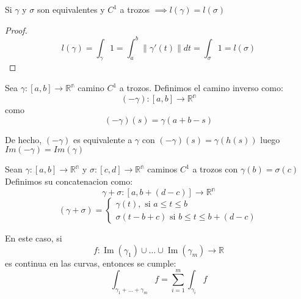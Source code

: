 \begin{corolario}
    Si $\gamma$ y $\sigma$ son equivalentes y $C^1$ a trozos $\implies l(\gamma)=l(\sigma)$
\end{corolario}

\begin{proof}
    $$l(\gamma) =\int_{\gamma}1=\int_{a}^{b} \lVert \gamma'(t) \rVert dt=\int_{\sigma}1=l(\sigma)$$
\end{proof}

\begin{definición}
Sea $\gamma:[a,b] \to \mathbb{R^n}$ camino $C^1$ a trozos. Definimos el camino inverso como: \\
$$(-\gamma):[a,b] \to \mathbb{R^n}$$ como $$ (-\gamma)(s)=\gamma(a+b-s)$$
\end{definición}

\begin{observación}
De hecho, $(-\gamma)$ es equivalente a $\gamma$ con $(-\gamma)(s)=\gamma(h(s))$ luego $Im(-\gamma)=Im(\gamma)$
\end{observación}

\begin{definición}
Sean $\gamma:[a,b] \to \mathbb{R^n}$ y $\sigma:[c,d] \to \mathbb{R^n}$ caminos $C^1$ a trozos con $\gamma(b)=\sigma(c)$\\
Definimos su concatenacion como:\\
$$\gamma + \sigma:[a,b+(d-c)] \to \mathbb{R^n}$$
$$(\gamma + \sigma) = \begin{cases}
        \gamma(t), \text{ si } a \leq t \leq b \\
        \sigma(t - b + c) \text{ si } b\leq t \leq b+(d-c)
    \end{cases}$$
\end{definición}

\begin{observación}
En este caso, si
\[
    f : \operatorname{Im}(\gamma_1) \cup \dots \cup \operatorname{Im}(\gamma_m) \longrightarrow \mathbb{R}
\]
es continua en las curvas, entonces se cumple:
\[
    \int_{\gamma_1 + \dots + \gamma_m} f = \sum_{i=1}^{m} \int_{\gamma_i} f
\]
\end{observación}

